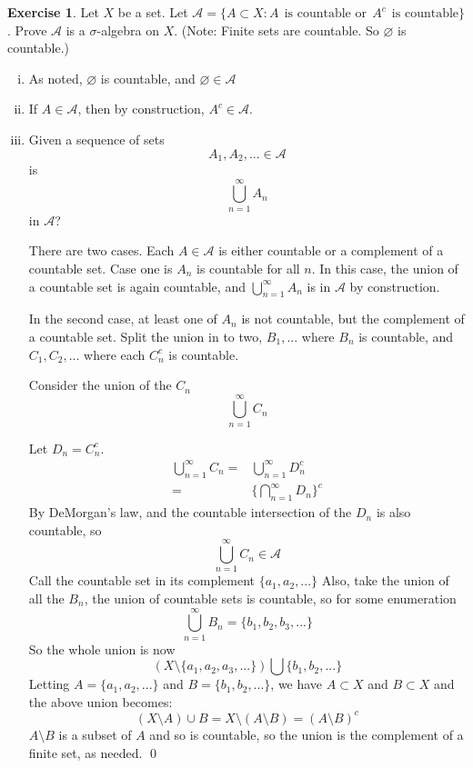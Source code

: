 \documentclass[11pt,oneside]{article}
\numberwithin{equation}{section}
\theoremstyle{definition}
\newtheorem{exercise}{Exercise}
\def\calA{\mathcal{A}}
\begin{document}
\begin{exercise}
  Let $X$ be a set. Let $ \calA = \{A \subset X : A \ \ \text{is 
    countable or} \ \ A^c \ \ \text{is countable} \}$.  Prove $\calA$ is a
    $\sigma$-algebra on $X$. (Note: Finite sets are countable. So
    $\varnothing$ is countable.)
\end{exercise}
\begin{solution}
  \begin{enumerate}[(i)]
    \item
      As noted, $\varnothing $ is countable, and $\varnothing \in \calA$
    \item
      If $A \in \calA$, then by construction, $A^c \in \calA$.
    \item
      Given a sequence of sets
      $$
      A_1, A_2, ... \in \calA
      $$
      is
      $$ \bigcup _ {n =1} ^ \infty A_n
      $$ in $\calA$?

      There are two cases.  Each $A \in \calA$ is either countable or
      a complement of a countable set.  Case one is $A_n$ is countable
      for all $n$.  In this case, the union of a countable set is again countable, and
      $ \bigcup _ {n =1} ^ \infty A_n $ is in $\calA$ by construction.

      In the second case, at least one of $A_n$ is not countable, but
      the complement of a countable set.  Split the union in to two,
      $B_1, ... $ where $B_n$ is countable, and $C_1, C_2,...$ where
      each $C_n^c$ is countable.

      Consider the union of the $C_n$
      $$
      \bigcup _ {n=1}^\infty C_n
      $$

      Let $D_n = C_n ^c$.  
      \begin{align*}
      \bigcup _ {n=1}^\infty C_n = & \bigcup _ {n=1}^\infty D_n^c \\ 
      = &  \{ \bigcap _{n=1}^\infty D_n \} ^ c
      \end{align*}
      By DeMorgan's law, and the countable intersection of the $D_n$ is
      also countable, so
      $$
      \bigcup _ {n=1}^\infty C_n \in \calA
      $$
      Call the countable set in its complement $ \{ a_1, a_2, ... \}$
      Also, take the union of all the $B_n$, the union of countable sets
      is countable, so for some enumeration
      $$
      \bigcup _{n=1}^\infty B_n = \{ b_1, b_2, b_3, ... \}
      $$
      So the whole union is now
      $$
      ( X \setminus \{a_1, a_2, a_3, ... \}) \bigcup \{b_1, b_2, ... \}
      $$
      Letting $ A = \{ a_1, a_2, ... \}$ and 
      $ B = \{ b_1, b_2, ... \} $, we have $A \subset X $ and $B \subset X$ and the
      above union becomes:
      $$
      (X \setminus A ) \cup B = X \setminus ( A \setminus B) = (A \setminus B) ^c
      $$
      $A \setminus B$ is a subset of $A$ and so is countable, so the union is the complement of a
      finite set, as needed.  \qed

      
      
  \end{enumerate}

\end{solution}
\end{document}

